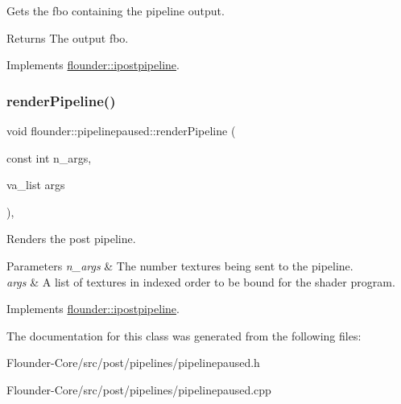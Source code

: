 Gets the fbo containing the pipeline output. 

\begin{DoxyReturn}{Returns}
The output fbo. 
\end{DoxyReturn}


Implements \hyperlink{classflounder_1_1ipostpipeline_a08f5d19b9652528337b73c2f4e0e4258}{flounder\+::ipostpipeline}.

\mbox{\label{classflounder_1_1pipelinepaused_ad524695829a716d4726118c2e6ac43a1}} 
\subsubsection{\texorpdfstring{render\+Pipeline()}{renderPipeline()}}
{\footnotesize\ttfamily void flounder\+::pipelinepaused\+::render\+Pipeline (\begin{DoxyParamCaption}\item[{const int}]{n\+\_\+args,  }\item[{va\+\_\+list}]{args }\end{DoxyParamCaption})\hspace{0.3cm}{\ttfamily [override]}, {\ttfamily [virtual]}}



Renders the post pipeline. 


\begin{DoxyParams}{Parameters}
{\em n\+\_\+args} & The number textures being sent to the pipeline. \\
\hline
{\em args} & A list of textures in indexed order to be bound for the shader program. \\
\hline
\end{DoxyParams}


Implements \hyperlink{classflounder_1_1ipostpipeline_a25255482fdb75f92b8c3f940ca8c583a}{flounder\+::ipostpipeline}.



The documentation for this class was generated from the following files\+:\begin{DoxyCompactItemize}
\item 
Flounder-\/\+Core/src/post/pipelines/pipelinepaused.\+h\item 
Flounder-\/\+Core/src/post/pipelines/pipelinepaused.\+cpp\end{DoxyCompactItemize}
